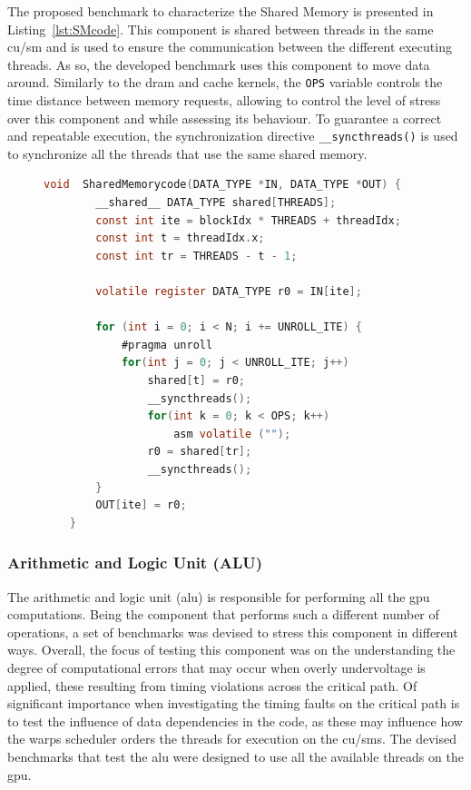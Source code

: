 The proposed benchmark to characterize the Shared Memory is presented in Listing~\ref{lst:SMcode}. This component is shared between threads in the same \acrshort{cu}/\acrshort{sm} and is used to ensure the communication between the different executing threads. As so, the developed benchmark uses this component to move data around. Similarly to the \acrshort{dram} and cache kernels, the \texttt{OPS} variable controls the time distance between memory requests, allowing to control the level of stress over this component and while assessing its behaviour. To guarantee a correct and repeatable execution, the synchronization directive \texttt{\_\_syncthreads()} is used to synchronize all the threads that use the same shared memory.

\begin{figure}[h]
    \begin{lstlisting}[language=C, caption=Shared Memory Benchmark code, label=lst:SMcode, basicstyle=\footnotesize\ttfamily, abovecaptionskip=0pt, captionpos=b]
    void  SharedMemorycode(DATA_TYPE *IN, DATA_TYPE *OUT) {
        __shared__ DATA_TYPE shared[THREADS];
        const int ite = blockIdx * THREADS + threadIdx;
        const int t = threadIdx.x;
        const int tr = THREADS - t - 1;
        
        volatile register DATA_TYPE r0 = IN[ite];
        
        for (int i = 0; i < N; i += UNROLL_ITE) {
            #pragma unroll
            for(int j = 0; j < UNROLL_ITE; j++)  
                shared[t] = r0;
                __syncthreads();
                for(int k = 0; k < OPS; k++) 
                    asm volatile ("");
                r0 = shared[tr];
                __syncthreads();
        }
        OUT[ite] = r0;
    }
    \end{lstlisting}
\end{figure}

\subsubsection{Arithmetic and Logic Unit (ALU)}

The arithmetic and logic unit (\acrshort{alu}) is responsible for performing all the \acrshort{gpu} computations.  Being the component that performs such a different number of operations, a set of benchmarks was devised to stress this component in different ways. Overall, the focus of testing this component was on the understanding the degree of computational errors that may occur when overly undervoltage is applied, these resulting from timing violations across the critical path. Of significant importance when investigating the timing faults on the critical path is to test the influence of data dependencies in the code, as these may influence how the warps scheduler orders the threads for execution on the \acrshort{cu}/\acrshort{sm}s. The devised benchmarks that test the \acrshort{alu} were designed to use all the available threads on the \acrshort{gpu}.

